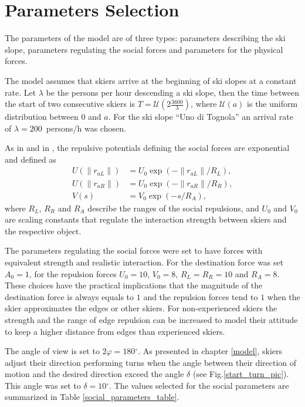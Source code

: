 \documentclass[12pt,a4paper,twoside]{book}
\newcommand{\norm}[1]{\lVert#1\rVert}
\newcommand{\degree}{\ensuremath{^\circ}}
\begin{document}
\section{Parameters Selection}
The parameters of the model are of three types: parameters describing the ski slope, parameters regulating the social forces and parameters for the physical forces.

The model assumes that skiers arrive at the beginning of ski slopes at a constant rate. Let $\lambda$ be the persons per hour descending a ski slope, then the time between the start of two consecutive skiers is $T=\mathcal{U}\left(2\frac{3600}{\lambda}\right)$, where $\mathcal{U}(a)$ is the uniform distribution between $0$ and $a$. For the ski slope ``Uno di Tognola'' an arrival rate of $\lambda=200$~persons/h was chosen.

As in \cite{hol2012} and in \cite{hel2008}, the repulsive potentials defining the social forces are exponential and defined as
\begin{align}
U(\norm{r_{aL}})&=U_0 \exp(-\norm{r_{aL}}/R_L), \\
U(\norm{r_{aR}})&=U_0 \exp(-\norm{r_{aR}}/R_R), \\
V(s)&=V_0 \exp(-s/R_A),
\end{align}
where $R_L$, $R_R$ and $R_A$ describe the ranges of the social repulsions, and $U_0$ and $V_0$ are scaling constants that regulate the interaction strength between skiers and the respective object.

The parameters regulating the social forces were set to have forces with equivalent strength and realistic interaction. For the destination force was set $A_0=1$, for the repulsion forces $U_0=10$, $V_0=8$, $R_L=R_R=10$ and $R_A=8$. These choices have the practical implications that the magnitude of the destination force is always equals to $1$ and the repulsion forces tend to $1$ when the skier approximates the edges or other skiers. For non-experienced skiers the strength and the range of edge repulsion can be increased to model their attitude to keep a higher distance from edges than experienced skiers.

 The angle of view is set to $2\varphi=180\degree$. As presented in chapter \ref{model}, skiers adjust their direction performing turns when the angle between their direction of motion and the desired direction exceed the angle $\delta$ (see Fig.\ref{start_turn_pic}). This angle was set to $\delta=10\degree$. The values selected for the social parameters are summarized in Table \ref{social_parameters_table}.
\end{document}
